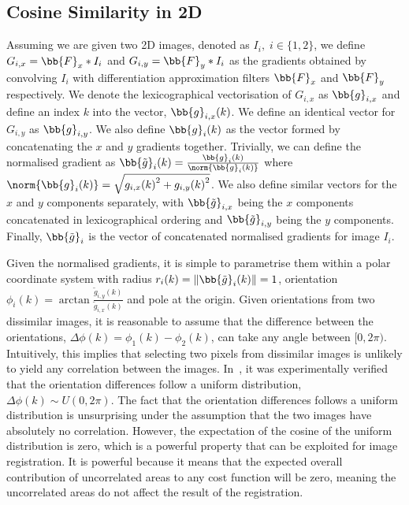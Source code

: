\subsection{Cosine Similarity in 2D}\label{subsec:singl_img_cosine_2d}
Assuming we are given two 2D images, denoted as $I_i, \; i \in \{1,2\}$, we
define $G_{i,x} = \bb{F}_x \ast I_i$ and $G_{i,y} = \bb{F}_y \ast I_i$
as the gradients obtained by convolving $I_i$ with differentiation approximation
filters $\bb{F}_x$ and $\bb{F}_y$ respectively. We denote the
lexicographical vectorisation of $G_{i,x}$ as $\bb{g}_{i,x}$ and define an
index $k$ into the vector, $\bb{g}_{i,x}(k)$. We define an identical vector
for $G_{i,y}$ as $\bb{g}_{i,y}$. We also define $\bb{g}_{i}(k)$ as the
vector formed by concatenating the $x$ and $y$ gradients together. Trivially, we
can define the normalised gradient as
$\bb{\tilde{g}}_{i}(k) = \frac{\bb{g}_{i}(k)}{\norm{\bb{g}_{i}(k)}}$ where
$\norm{\bb{g}_{i}(k)} = \sqrt{{g_{i,x}(k)}^2 + {g_{i,y}(k)}^2}$.  We also define
similar vectors for the $x$ and $y$ components separately, with
$\bb{\tilde{g}}_{i,x}$ being the $x$ components concatenated in
lexicographical ordering and $\bb{\tilde{g}}_{i,y}$ being the $y$ components.
Finally, $\bb{\tilde{g}}_{i}$ is the vector of concatenated normalised
gradients for image $I_i$.

Given the normalised gradients, it is simple to parametrise them within a polar
coordinate system with radius $r_i(k) = \lVert \bb{\tilde{g}}_{i}(k) \rVert = 1$,
orientation $\phi_i(k) = \arctan{\frac{\tilde{g}_{i,y}(k)}{\tilde{g}_{i,x}(k)}}$
and pole at the origin.
Given orientations from two dissimilar images, it is reasonable to assume that the
difference between the orientations, $\Delta \phi(k) = \phi_1(k) - \phi_2(k)$,
can take any angle between $[0, 2\pi)$. Intuitively, this implies that selecting
two pixels from dissimilar images is unlikely to yield any correlation between
the images.
In~\cite{tzimiropoulos2011robust,tzimiropoulos2012subspace},
it was experimentally verified that the
orientation differences follow a uniform distribution, $\Delta \phi(k) \sim U(0,
2\pi)$. The fact that the orientation differences follows a uniform distribution
is unsurprising under the assumption that the two images have absolutely no
correlation. However, the expectation of the cosine of the uniform distribution
is zero, which is a powerful property that can be exploited for image
registration. It is powerful because it means that the expected overall
contribution of uncorrelated areas to any cost function will be zero, meaning
the uncorrelated areas do not affect the result of the registration.

